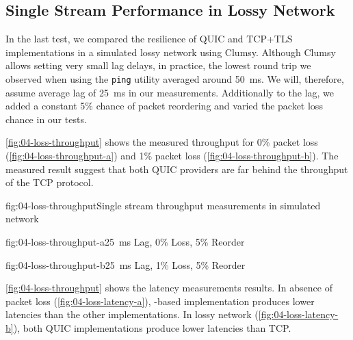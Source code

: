 \subsection{Single Stream Performance in Lossy Network}

In the last test, we compared the resilience of QUIC and TCP+TLS implementations in a simulated
lossy network using Clumsy. Although Clumsy allows setting very small lag delays, in practice, the
lowest round trip we observed when using the \texttt{ping} utility averaged around
\SI{50}{\milli\second}. We will, therefore, assume average lag of \SI{25}{\milli\second} in our
measurements. Additionally to the lag, we added a constant 5\% chance of packet reordering and
varied the packet loss chance in our tests.




\autoref{fig:04-loss-throughput} shows the measured throughput for 0\% packet loss
(\autoref{fig:04-loss-throughput-a}) and 1\% packet loss (\autoref{fig:04-loss-throughput-b}). The
measured result suggest that both QUIC providers are far behind the throughput of the TCP protocol.

\begin{myFigure}{fig:04-loss-throughput}{Single stream throughput measurements in simulated network}
\begin{mySubfigure}{0.49\linewidth}{fig:04-loss-throughput-a}{\SI{25}{\milli\second} Lag, 0\% Loss, 5\% Reorder}
\footnotesize

\end{mySubfigure}
\begin{mySubfigure}{0.49\linewidth}{fig:04-loss-throughput-b}{\SI{25}{\milli\second} Lag, 1\% Loss, 5\% Reorder}
\footnotesize

\end{mySubfigure}
\end{myFigure}

\autoref{fig:04-loss-throughput} shows the latency measurements results. In absence of packet loss
(\autoref{fig:04-loss-latency-a}), \libmsquic{}-based implementation produces lower latencies than
the other implementations. In lossy network (\autoref{fig:04-loss-latency-b}), both QUIC
implementations produce lower latencies than TCP\@.

